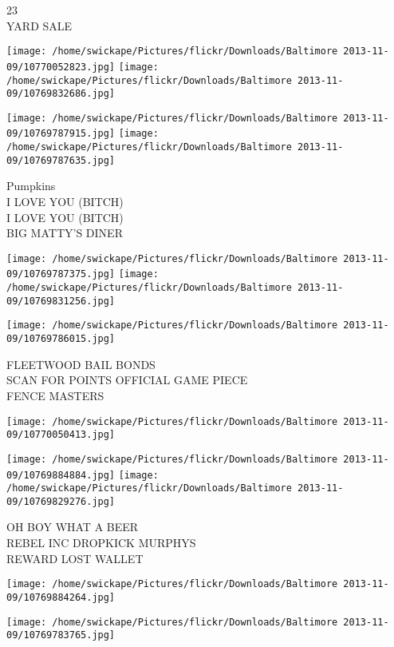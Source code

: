 \documentclass[10pt,letterpaper]{article}
\begin{document}
23\\
YARD SALE\\
\pagebreak

\texttt{[image: /home/swickape/Pictures/flickr/Downloads/Baltimore 2013-11-09/10770052823.jpg]}
\texttt{[image: /home/swickape/Pictures/flickr/Downloads/Baltimore 2013-11-09/10769832686.jpg]}

\texttt{[image: /home/swickape/Pictures/flickr/Downloads/Baltimore 2013-11-09/10769787915.jpg]}
\texttt{[image: /home/swickape/Pictures/flickr/Downloads/Baltimore 2013-11-09/10769787635.jpg]}

Pumpkins\\
I LOVE YOU (BITCH)\\
I LOVE YOU (BITCH)\\
BIG MATTY'S DINER\\
\pagebreak

\texttt{[image: /home/swickape/Pictures/flickr/Downloads/Baltimore 2013-11-09/10769787375.jpg]}
\texttt{[image: /home/swickape/Pictures/flickr/Downloads/Baltimore 2013-11-09/10769831256.jpg]}

\vspace{0.25in}
\texttt{[image: /home/swickape/Pictures/flickr/Downloads/Baltimore 2013-11-09/10769786015.jpg]}

FLEETWOOD BAIL BONDS\\
SCAN FOR POINTS OFFICIAL GAME PIECE\\
FENCE MASTERS\\
\pagebreak

\texttt{[image: /home/swickape/Pictures/flickr/Downloads/Baltimore 2013-11-09/10770050413.jpg]}

\vspace{0.25in}
\texttt{[image: /home/swickape/Pictures/flickr/Downloads/Baltimore 2013-11-09/10769884884.jpg]}
\texttt{[image: /home/swickape/Pictures/flickr/Downloads/Baltimore 2013-11-09/10769829276.jpg]}

OH BOY WHAT A BEER\\
REBEL INC DROPKICK MURPHYS\\
REWARD LOST WALLET\\
\pagebreak

\texttt{[image: /home/swickape/Pictures/flickr/Downloads/Baltimore 2013-11-09/10769884264.jpg]}

\vspace{0.25in}
\texttt{[image: /home/swickape/Pictures/flickr/Downloads/Baltimore 2013-11-09/10769783765.jpg]}
\end{document}
